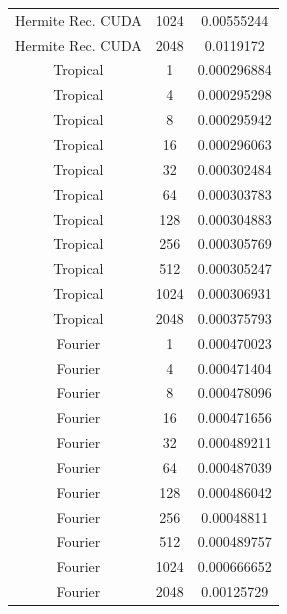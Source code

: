 \documentclass{article} %
\theoremstyle{plain}
\theoremstyle{definition}
\theoremstyle{remark}
\begin{document}
\begin{table}[!htbp]
\begin{center}
\begin{small}
\begin{tabular}{ccc}
 Hermite Rec. CUDA &     1024 &             0.00555244  \\
 Hermite Rec. CUDA &     2048 &             0.0119172   \\
\midrule 
 Tropical          &        1 &             0.000296884 \\
 Tropical          &        4 &             0.000295298 \\
 Tropical          &        8 &             0.000295942 \\
 Tropical          &       16 &             0.000296063 \\
 Tropical          &       32 &             0.000302484 \\
 Tropical          &       64 &             0.000303783 \\
 Tropical          &      128 &             0.000304883 \\
 Tropical          &      256 &             0.000305769 \\
 Tropical          &      512 &             0.000305247 \\
 Tropical          &     1024 &             0.000306931 \\
 Tropical          &     2048 &             0.000375793 \\
\midrule 
 Fourier           &        1 &             0.000470023 \\
 Fourier           &        4 &             0.000471404 \\
 Fourier           &        8 &             0.000478096 \\
 Fourier           &       16 &             0.000471656 \\
 Fourier           &       32 &             0.000489211 \\
 Fourier           &       64 &             0.000487039 \\
 Fourier           &      128 &             0.000486042 \\
 Fourier           &      256 &             0.00048811  \\
 Fourier           &      512 &             0.000489757 \\
 Fourier           &     1024 &             0.000666652 \\
 Fourier           &     2048 &             0.00125729  \\
\bottomrule
\end{tabular}
\end{small}
\end{center}
\vskip -0.1in
\end{table}
\end{document}
